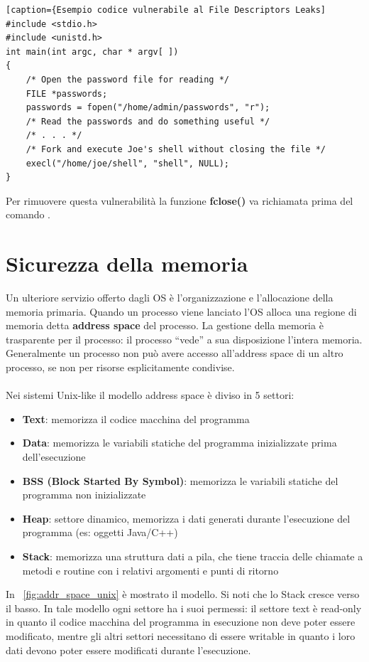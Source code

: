 \begin{algorithm}
\begin{lstlisting}
[caption={Esempio codice vulnerabile al File Descriptors Leaks]
#include <stdio.h>
#include <unistd.h>
int main(int argc, char * argv[ ])
{
	/* Open the password file for reading */
	FILE *passwords;
	passwords = fopen("/home/admin/passwords", "r");
	/* Read the passwords and do something useful */
	/* . . . */
	/* Fork and execute Joe's shell without closing the file */
	execl("/home/joe/shell", "shell", NULL);
}
\end{lstlisting}
\end{algorithm}
Per rimuovere questa vulnerabilità la funzione \textbf{fclose()} va richiamata prima del comando .

\section{Sicurezza della memoria}
Un ulteriore servizio offerto dagli OS è l'organizzazione e l'allocazione della memoria primaria. Quando un processo viene lanciato l'OS alloca una regione di memoria detta \textbf{address space} del processo. La gestione della memoria è trasparente per il processo: il processo “vede” a sua disposizione l'intera memoria. Generalmente un processo non può avere accesso all'address space di un altro processo, se non per risorse esplicitamente condivise. \\ \\
Nei sistemi Unix-like il modello address space è diviso in 5 settori:
\begin{itemize}
  \item \textbf{Text}: memorizza il codice macchina del programma
  \item \textbf{Data}: memorizza le variabili statiche del programma inizializzate prima dell'esecuzione
  \item	\textbf{BSS (Block Started By Symbol)}: memorizza le variabili statiche del programma non inizializzate
  \item	\textbf{Heap}: settore dinamico, memorizza i dati generati durante l'esecuzione del programma (es: oggetti Java/C++) 
  \item	\textbf{Stack}: memorizza una struttura dati a pila, che tiene traccia delle chiamate a metodi e routine con i relativi argomenti e punti di ritorno 
\end{itemize}
In \figurename~\ref{fig:addr_space_unix} è mostrato il modello. Si noti che lo Stack cresce verso il basso. In tale modello ogni settore ha i suoi permessi: il settore text è read-only in quanto il codice macchina del programma in esecuzione non deve poter essere modificato, mentre gli altri settori necessitano di essere writable in quanto i loro dati devono poter essere modificati durante l'esecuzione.
